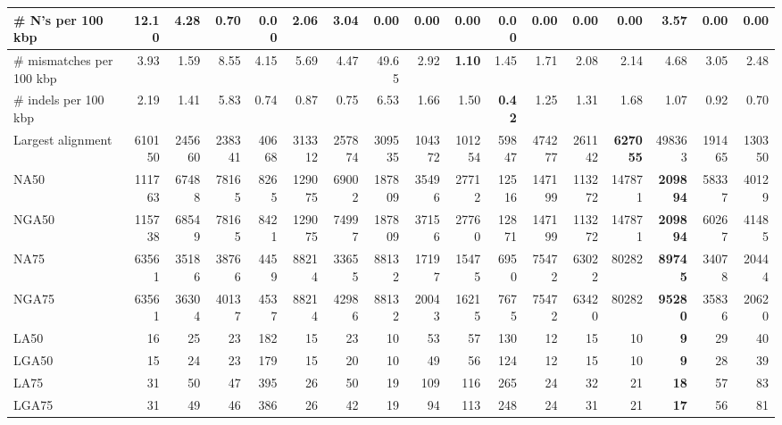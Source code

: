 \documentclass[12pt,a4paper]{article}
\begin{document}
\begin{table}[ht]
\begin{center}
\begin{tabular}{|l*{16}{|r}|}
\# N's per 100 kbp & 12.10 & 4.28 & 0.70 & {\bf 0.00} & 2.06 & 3.04 & {\bf 0.00} & {\bf 0.00} & {\bf 0.00} & {\bf 0.00} & {\bf 0.00} & {\bf 0.00} & {\bf 0.00} & 3.57 & {\bf 0.00} & {\bf 0.00} \\ \hline
\# mismatches per 100 kbp & 3.93 & 1.59 & 8.55 & 4.15 & 5.69 & 4.47 & 49.65 & 2.92 & {\bf 1.10} & 1.45 & 1.71 & 2.08 & 2.14 & 4.68 & 3.05 & 2.48 \\ \hline
\# indels per 100 kbp & 2.19 & 1.41 & 5.83 & 0.74 & 0.87 & 0.75 & 6.53 & 1.66 & 1.50 & {\bf 0.42} & 1.25 & 1.31 & 1.68 & 1.07 & 0.92 & 0.70 \\ \hline
Largest alignment & 610150 & 245660 & 238341 & 40668 & 313312 & 257874 & 309535 & 104372 & 101254 & 59847 & 474277 & 261142 & {\bf 627055} & 498363 & 191465 & 130350 \\ \hline
NA50 & 111763 & 67488 & 78165 & 8265 & 129075 & 69002 & 187809 & 35496 & 27712 & 12516 & 147199 & 113272 & 147871 & {\bf 209894} & 58337 & 40129 \\ \hline
NGA50 & 115738 & 68549 & 78165 & 8421 & 129075 & 74997 & 187809 & 37156 & 27760 & 12871 & 147199 & 113272 & 147871 & {\bf 209894} & 60267 & 41485 \\ \hline
NA75 & 63561 & 35186 & 38766 & 4459 & 88214 & 33655 & 88132 & 17197 & 15475 & 6950 & 75472 & 63022 & 80282 & {\bf 89745} & 34078 & 20444 \\ \hline
NGA75 & 63561 & 36304 & 40137 & 4537 & 88214 & 42986 & 88132 & 20043 & 16215 & 7675 & 75472 & 63420 & 80282 & {\bf 95280} & 35836 & 20620 \\ \hline
LA50 & 16 & 25 & 23 & 182 & 15 & 23 & 10 & 53 & 57 & 130 & 12 & 15 & 10 & {\bf 9} & 29 & 40 \\ \hline
LGA50 & 15 & 24 & 23 & 179 & 15 & 20 & 10 & 49 & 56 & 124 & 12 & 15 & 10 & {\bf 9} & 28 & 39 \\ \hline
LA75 & 31 & 50 & 47 & 395 & 26 & 50 & 19 & 109 & 116 & 265 & 24 & 32 & 21 & {\bf 18} & 57 & 83 \\ \hline
LGA75 & 31 & 49 & 46 & 386 & 26 & 42 & 19 & 94 & 113 & 248 & 24 & 31 & 21 & {\bf 17} & 56 & 81 \\ \hline
\end{tabular}
\end{center}
\end{table}
\end{document}
